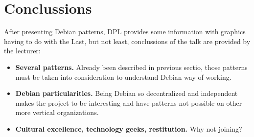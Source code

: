 \documentclass[11pt]{article}
\begin{document}
\section{Conclussions}
After presenting Debian patterns, DPL provides some information with graphics having to do with the 
Last, but not least, conclussions of the talk are provided by the lecturer:
\begin{itemize}\itemsep0pt
\item{\textbf{Several patterns.}} Already been described in previous sectio, those patterns must be taken into consideration to understand Debian way of working.
\item{\textbf{Debian particularities.}} Being Debian so decentralized and independent makes the project to be interesting and have patterns not possible on other more vertical organizations.
\item{\textbf{Cultural excellence, technology geeks, restitution.}} Why not joining?
\end{itemize}


{}
\end{document}
